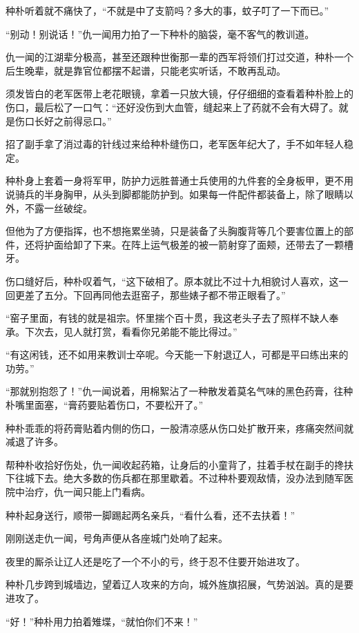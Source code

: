 种朴听着就不痛快了，“不就是中了支箭吗？多大的事，蚊子叮了一下而已。”

“别动！别说话！”仇一闻用力拍了一下种朴的脑袋，毫不客气的教训道。

仇一闻的江湖辈分极高，甚至还跟种世衡那一辈的西军将领们打过交道，种朴一个后生晚辈，就是靠官位都摆不起谱，只能老实听话，不敢再乱动。

须发皆白的老军医带上老花眼镜，拿着一只放大镜，仔仔细细的查看着种朴脸上的伤口，最后松了一口气：“还好没伤到大血管，缝起来上了药就不会有大碍了。就是伤口长好之前得忌口。”

招了副手拿了消过毒的针线过来给种朴缝伤口，老军医年纪大了，手不如年轻人稳定。

种朴身上套着一身将军甲，防护力远胜普通士兵使用的九件套的全身板甲，更不用说骑兵的半身胸甲，从头到脚都能防护到。如果每一件配件都装备上，除了眼睛以外，不露一丝破绽。

但他为了方便指挥，也不想拖累坐骑，只是装备了头胸腹背等几个要害位置上的部件，还将护面给卸了下来。在阵上运气极差的被一箭射穿了面颊，还带去了一颗槽牙。

伤口缝好后，种朴叹着气，“这下破相了。原本就比不过十九相貌讨人喜欢，这一回更差了五分。下回再同他去逛窑子，那些婊子都不带正眼看了。”

“窑子里面，有钱的就是祖宗。怀里揣个百十贯，我这老头子去了照样不缺人奉承。下次去，见人就打赏，看看你兄弟能不能比得过。”

“有这闲钱，还不如用来教训士卒呢。今天能一下射退辽人，可都是平曰练出来的功劳。”

“那就别抱怨了！”仇一闻说着，用棉絮沾了一种散发着莫名气味的黑色药膏，往种朴嘴里面塞，“膏药要贴着伤口，不要松开了。”

种朴乖乖的将药膏贴着内侧的伤口，一股清凉感从伤口处扩散开来，疼痛突然间就减退了许多。

帮种朴收拾好伤处，仇一闻收起药箱，让身后的小童背了，拄着手杖在副手的搀扶下往城下去。绝大多数的伤兵都在那里歇着。不过种朴要观敌情，没办法到随军医院中治疗，仇一闻只能上门看病。

种朴起身送行，顺带一脚踢起两名亲兵，“看什么看，还不去扶着！”

刚刚送走仇一闻，号角声便从各座城门处响了起来。

夜里的厮杀让辽人还是吃了一个不小的亏，终于忍不住要开始进攻了。

种朴几步跨到城墙边，望着辽人攻来的方向，城外旌旗招展，气势汹汹。真的是要进攻了。

“好！”种朴用力拍着雉堞，“就怕你们不来！”
